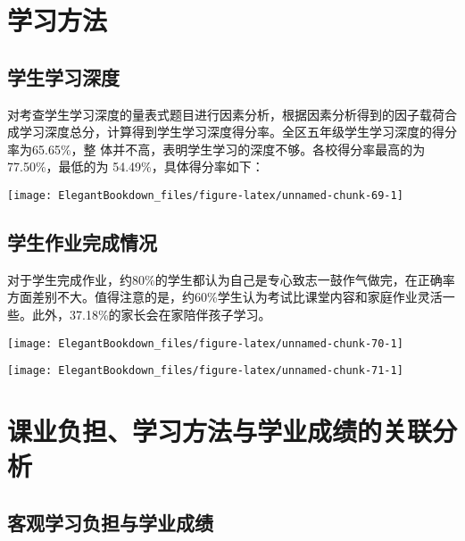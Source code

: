 \documentclass[cn, 11pt, fancy, hide]{elegantbook}
\begin{document}
\cleardoublepage

\hypertarget{section-20}{%
\section{学习方法}\label{section-20}}

\hypertarget{section-21}{%
\subsection{学生学习深度}\label{section-21}}

对考查学生学习深度的量表式题目进行因素分析，根据因素分析得到的因子载荷合成学习深度总分，计算得到学生学习深度得分率。全区五年级学生学习深度的得分率为65.65\%，整
体并不高，表明学生学习的深度不够。各校得分率最高的为 77.50\%，最低的为 54.49\%，具体得分率如下：

\begin{center}\texttt{[image: ElegantBookdown\_files/figure-latex/unnamed-chunk-69-1]} \end{center}

\hypertarget{section-22}{%
\subsection{学生作业完成情况}\label{section-22}}

对于学生完成作业，约80\%的学生都认为自己是专心致志一鼓作气做完，在正确率方面差别不大。值得注意的是，约60\%学生认为考试比课堂内容和家庭作业灵活一些。此外，37.18\%的家长会在家陪伴孩子学习。

\begin{center}\texttt{[image: ElegantBookdown\_files/figure-latex/unnamed-chunk-70-1]} \end{center}

\begin{center}\texttt{[image: ElegantBookdown\_files/figure-latex/unnamed-chunk-71-1]} \end{center}

\hypertarget{section-23}{%
\section{课业负担、学习方法与学业成绩的关联分析}\label{section-23}}

\hypertarget{section-24}{%
\subsection{客观学习负担与学业成绩}\label{section-24}}
\end{document}
